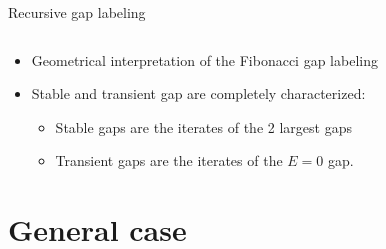 \documentclass[xcolor=x11names,compress,professionalfonts]{beamer}
\renewcommand{\(}{\begin{columns}}
\renewcommand{\)}{\end{columns}}
\newcommand{\<}[1]{\begin{column}{#1}}
\renewcommand{\>}{\end{column}}
\begin{document}
\begin{frame}{Recursive gap labeling}
\begin{columns}
\begin{column}{5cm}
  \end{column}
\end{columns}

\begin{itemize}
	\item Geometrical interpretation of the Fibonacci gap labeling
	\item Stable and transient gap are completely characterized:
	\begin{itemize}
		\item {\color{BostonBlue}Stable gaps} are the iterates of the 2 largest gaps
		\item {\color{Complementary}Transient gaps} are the iterates of the $E=0$ gap.
	\end{itemize}	 
\end{itemize}

\end{frame}

\section{General case}
\end{document}
